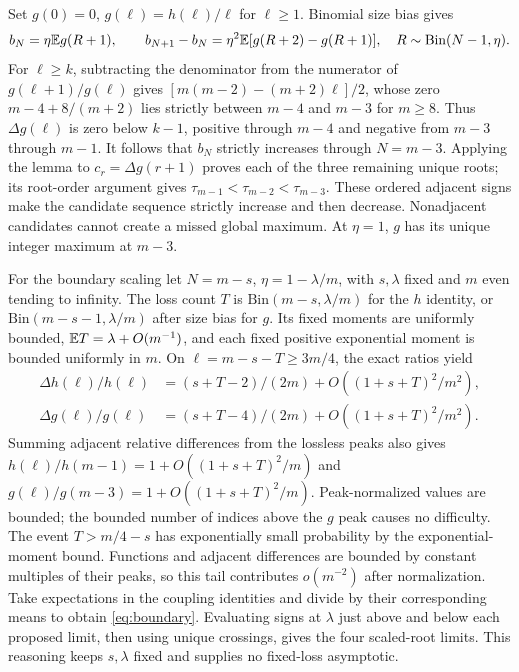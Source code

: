 Set $g(0)=0$, $g(\ell)=h(\ell)/\ell$ for $\ell\ge1$. Binomial size bias gives
\begin{equation}
 b_N=\eta\mathbb E g(R+1),\qquad b_{N+1}-b_N=\eta^2\mathbb E[g(R+2)-g(R+1)],\quad R\sim\mathrm{Bin}(N-1,\eta).
\end{equation}
For $\ell\ge k$, subtracting the denominator from the numerator of $g(\ell+1)/g(\ell)$ gives $[m(m-2)-(m+2)\ell]/2$, whose zero $m-4+8/(m+2)$ lies strictly between $m-4$ and $m-3$ for $m\ge8$. Thus $\Delta g(\ell)$ is zero below $k-1$, positive through $m-4$ and negative from $m-3$ through $m-1$. It follows that $b_N$ strictly increases through $N=m-3$. Applying the lemma to $c_r=\Delta g(r+1)$ proves each of the three remaining unique roots; its root-order argument gives $\tau_{m-1}<\tau_{m-2}<\tau_{m-3}$. These ordered adjacent signs make the candidate sequence strictly increase and then decrease. Nonadjacent candidates cannot create a missed global maximum. At $\eta=1$, $g$ has its unique integer maximum at $m-3$.

For the boundary scaling let $N=m-s$, $\eta=1-\lambda/m$, with $s,\lambda$ fixed and $m$ even tending to infinity. The loss count $T$ is $\mathrm{Bin}(m-s,\lambda/m)$ for the $h$ identity, or $\mathrm{Bin}(m-s-1,\lambda/m)$ after size bias for $g$. Its fixed moments are uniformly bounded, $\mathbb E T=\lambda+O(m^{-1})$, and each fixed positive exponential moment is bounded uniformly in $m$. On $\ell=m-s-T\ge3m/4$, the exact ratios yield
\begin{align}
 \Delta h(\ell)/h(\ell)&=(s+T-2)/(2m)+O((1+s+T)^2/m^2),\\
 \Delta g(\ell)/g(\ell)&=(s+T-4)/(2m)+O((1+s+T)^2/m^2).
\end{align}
Summing adjacent relative differences from the lossless peaks also gives $h(\ell)/h(m-1)=1+O((1+s+T)^2/m)$ and $g(\ell)/g(m-3)=1+O((1+s+T)^2/m)$. Peak-normalized values are bounded; the bounded number of indices above the $g$ peak causes no difficulty. The event $T>m/4-s$ has exponentially small probability by the exponential-moment bound. Functions and adjacent differences are bounded by constant multiples of their peaks, so this tail contributes $o(m^{-2})$ after normalization. Take expectations in the coupling identities and divide by their corresponding means to obtain \cref{eq:boundary}. Evaluating signs at $\lambda$ just above and below each proposed limit, then using unique crossings, gives the four scaled-root limits. This reasoning keeps $s,\lambda$ fixed and supplies no fixed-loss asymptotic.
